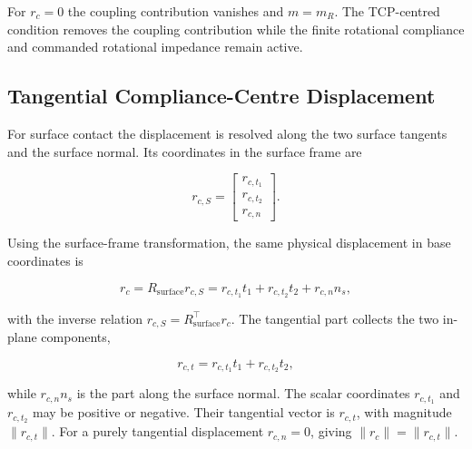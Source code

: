 

For \mbox{\(r_c=0\)} the coupling contribution vanishes and
\mbox{\(m=m_R\)}. The TCP-centred condition removes the coupling
contribution while the finite rotational compliance and commanded rotational
impedance remain active.

\subsection{Tangential Compliance-Centre Displacement}
\label{subsec:coc_tangential_displacement}

For surface contact the  displacement is resolved along the two
surface tangents and the surface normal. Its coordinates in the surface
frame are

\begin{equation}
r_{c,S}
=
\begin{bmatrix}
r_{c,t_1}\\
r_{c,t_2}\\
r_{c,n}
\end{bmatrix}.
\label{eq:coc_surface_components}
\end{equation}

Using the surface-frame transformation, the same physical displacement in
base coordinates is

\begin{equation}
r_c
=
R_{\mathrm{surface}}r_{c,S}
=
r_{c,t_1}t_1+r_{c,t_2}t_2+r_{c,n}n_s,
\label{eq:coc_surface_to_base}
\end{equation}

with the inverse relation
\mbox{\(r_{c,S}=R_{\mathrm{surface}}^\top r_c\)}. The tangential part
collects the two in-plane components,

\begin{equation}
r_{c,t}
=
r_{c,t_1}t_1+r_{c,t_2}t_2,
\label{eq:coc_tangential_component}
\end{equation}

while \mbox{\(r_{c,n}n_s\)} is the part along the surface normal.
The scalar coordinates \mbox{\(r_{c,t_1}\)} and \mbox{\(r_{c,t_2}\)} may
be positive or negative. Their tangential vector is \mbox{\(r_{c,t}\)}, with
magnitude \mbox{\(\lVert r_{c,t}\rVert\)}. For a purely tangential displacement
\mbox{\(r_{c,n}=0\)}, giving
\mbox{\(\lVert r_c\rVert=\lVert r_{c,t}\rVert\)}.


